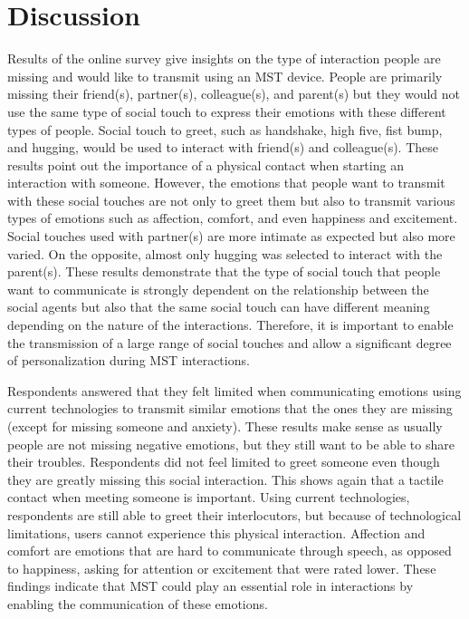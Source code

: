 \documentclass[acmsmall]{acmart}
\begin{document}
\section{Discussion}
Results of the online survey give insights on the type of interaction people are missing and would like to transmit using an MST device. People are primarily missing their friend(s), partner(s), colleague(s), and parent(s) but they would not use the same type of social touch to express their emotions with these different types of people. Social touch to greet, such as handshake, high five, fist bump, and hugging, would be used to interact with friend(s) and colleague(s). These results point out the importance of a physical contact when starting an interaction with someone. However, the emotions that people want to transmit with these social touches are not only to greet them but also to transmit various types of emotions such as affection, comfort, and even happiness and excitement. Social touches used with partner(s) are more intimate as expected but also more varied. On the opposite, almost only hugging was selected to interact with the parent(s). These results demonstrate that the type of social touch that people want to communicate is strongly dependent on the relationship between the social agents but also that the same social touch can have different meaning depending on the nature of the interactions. Therefore, it is important to enable the transmission of a large range of social touches and allow a significant degree of personalization during MST interactions. 

Respondents answered that they felt limited when communicating emotions using current technologies to transmit similar emotions that the ones they are missing (except for missing someone and anxiety). These results make sense as usually people are not missing negative emotions, but they still want to be able to share their troubles. Respondents did not feel limited to greet someone even though they are greatly missing this social interaction. This shows again that a tactile contact when meeting someone is important. Using current technologies, respondents are still able to greet their interlocutors, but because of technological limitations, users cannot experience this physical interaction. Affection and comfort are emotions that are hard to communicate through speech, as opposed to happiness, asking for attention or excitement that were rated lower. These findings indicate that MST could play an essential role in interactions by enabling the communication of these emotions.
\end{document}
